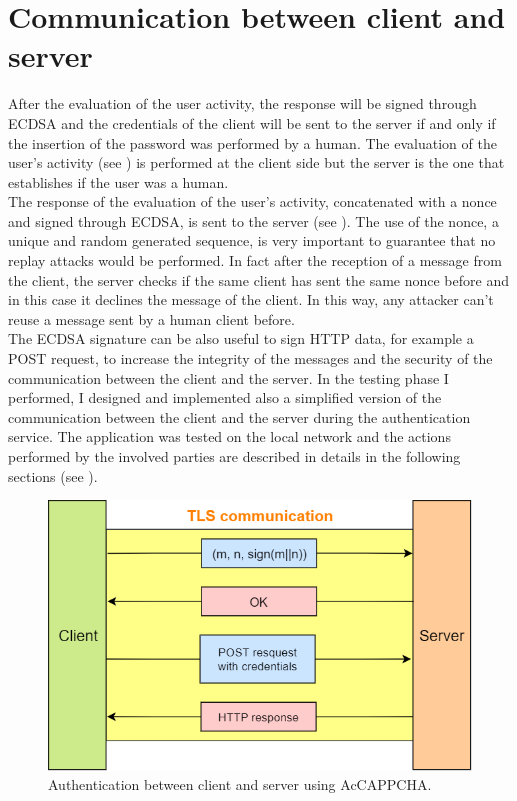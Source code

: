 \section{Communication between client and server}\label{AcCAPPCHA:communication_CS}
After the evaluation of the user activity, the response will be signed through ECDSA and the credentials of the client will be sent to the server if and only if the insertion of the password was performed by a human. The evaluation of the user's activity (see ) is performed at the client side but the server is the one that establishes if the user was a human.\\
The response of the evaluation of the user's activity, concatenated with a nonce and signed through ECDSA, is sent to the server (see ). The use of the nonce, a unique and random generated sequence, is very important to guarantee that no replay attacks would be performed. In fact after the reception of a message from the client, the server checks if the same client has sent the same nonce before and in this case it declines the message of the client. In this way, any attacker can't reuse a message sent by a human client before.\\
The ECDSA signature can be also useful to sign HTTP data, for example a POST request, to increase the integrity of the messages and the security of the communication between the client and the server. In the testing phase I performed, I designed and implemented also a simplified version of the communication between the client and the server during the authentication service. The application was tested on the local network and the actions performed by the involved parties are described in details in the following sections (see ).
\begin{figure}[h]
\centering
\includegraphics[width=.8\textwidth]{Images/AcCAPPCHA/client-server}
\caption{\footnotesize{Authentication between client and server using AcCAPPCHA.}}\label{AcCAPPCHA:ClientServer}
\end{figure}
